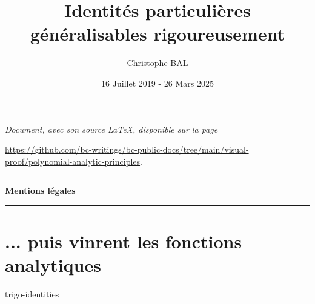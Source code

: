 \documentclass[12pt]{amsart}
\begin{document}
\title{Identités particulières généralisables rigoureusement}
\author{Christophe BAL}
\date{16 Juillet 2019 - 26 Mars 2025}

\maketitle

\begin{center}
	\itshape
	Document, avec son source \LaTeX, disponible sur la page

	\url{https://github.com/bc-writings/bc-public-docs/tree/main/visual-proof/polynomial-analytic-principles}.
\end{center}


\bigskip


\begin{center}
	\hrule\vspace{.3em}
	{
		\fontsize{1.35em}{1em}\selectfont
		\textbf{Mentions \og légales \fg}
	}

	\vspace{0.45em}
	\doclicenseThis
	\hrule
\end{center}


\bigskip


\setcounter{tocdepth}{1}
\tableofcontents



%
%
%
%
%
%
%
%
%
%
\newpage
\section{... puis vinrent les fonctions analytiques}

{trigo-identities}
\end{document}

